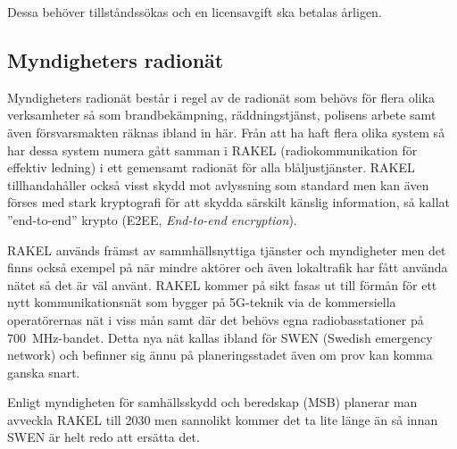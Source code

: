 Dessa behöver tillståndssökas och en licensavgift ska betalas årligen.

\subsection{Myndigheters radionät}

Myndigheters radionät består i regel av de radionät som behövs för flera olika
verksamheter så som brandbekämpning, räddningstjänst, polisens arbete samt
även försvarsmakten räknas ibland in här. Från att ha haft flera olika system
så har dessa system numera gått samman i RAKEL (radiokommunikation för
effektiv ledning) i ett gemensamt radionät för alla blåljustjänster. RAKEL
tillhandahåller också visst skydd mot avlyssning som standard men kan även
förses med stark kryptografi för att skydda särskilt känslig information, så
kallat ''end-to-end'' krypto (E2EE, {\it End-to-end encryption}).

RAKEL används främst av sammhällsnyttiga tjänster och myndigheter men det
finns också exempel på när mindre aktörer och även lokaltrafik har fått
använda nätet så det är väl använt. RAKEL kommer på sikt fasas ut till förmån
för ett nytt kommunikationsnät som bygger på 5G-teknik via de kommersiella
operatörernas nät i viss mån samt där det behövs egna radiobasstationer på
700~MHz-bandet. Detta nya nät kallas ibland för SWEN (Swedish emergency
network) och befinner sig ännu på planeringsstadet även om prov kan komma
ganska snart.

Enligt myndigheten för samhällsskydd och beredskap (MSB) planerar man avveckla
RAKEL till 2030 men sannolikt kommer det ta lite länge än så innan SWEN är
helt redo att ersätta det.

